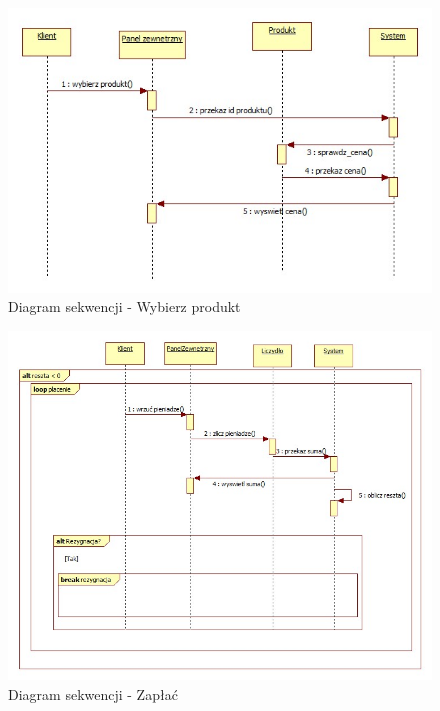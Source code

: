 \documentclass[a4paper, 11pt]{article}
\begin{document}
\begin{figure}[H]
\centerline{\includegraphics[scale=0.8]{../Diagrams/wybierzProdukt}}
\caption{Diagram sekwencji - Wybierz produkt}
\end{figure}

\begin{figure}[H]
\centerline{\includegraphics[scale=0.7]{../Diagrams/zaplac}}
\caption{Diagram sekwencji - Zapłać}
\end{figure}
\end{document}
